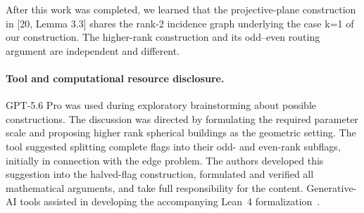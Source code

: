 \documentclass[11pt]{article}
\theoremstyle{plain}
\theoremstyle{definition}
\begin{document}
After this work was completed, we learned that the projective-plane construction in [20, Lemma 3.3] shares the rank-2 incidence graph underlying the case k=1 of our construction. The higher-rank construction and its odd–even routing argument are independent and different.
\paragraph{Tool and computational resource disclosure.}
GPT-5.6 Pro was used during exploratory brainstorming about possible constructions. The discussion was directed by formulating the required parameter scale and proposing higher rank spherical buildings as the geometric setting. The tool suggested splitting complete flags into their odd- and even-rank subflags, initially in connection with the edge problem. The authors developed this suggestion into the halved-flag construction, formulated and verified all mathematical arguments, and take full responsibility for the content. Generative-AI tools assisted in developing the accompanying Lean~4 formalization~\cite{CK26}.
\end{document}
